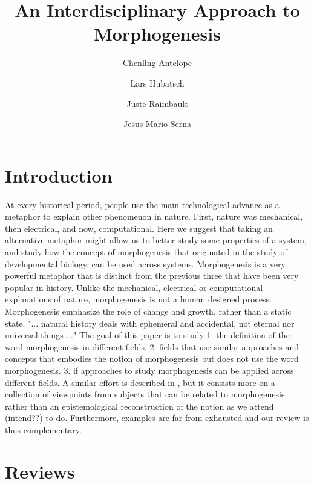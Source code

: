 \documentclass[fleqn,10pt]{wlscirep}
\title{An Interdisciplinary Approach to Morphogenesis}
\author[1]{Chenling Antelope}
\author[2]{Lars Hubatsch}
\author[3]{Juste Raimbault}
\author[4]{Jesus Mario Serna}
\affil[1]{Affiliation, department, city, postcode, country}
\affil[2]{Affiliation, department, city, postcode, country}
\affil[*]{corresponding.author@email.example}
\affil[+]{these authors contributed equally to this work}
\begin{document}
\flushbottom
\maketitle

\thispagestyle{empty}



\section*{Introduction}

At every historical period, people use the main technological advance as a metaphor to explain other phenomenon in nature. First, nature was mechanical, then electrical, and now, computational. Here we suggest that taking an alternative metaphor might allow us to better study some properties of a system, and study how the concept of morphogenesis that originated in the study of developmental biology, can be used across systems. Morphogenesis is a very powerful metaphor that is distinct from the previous three that have been very popular in history. Unlike the mechanical, electrical or computational explanations of nature, morphogenesis is not a human designed process. Morphogenesis emphasize the role of change and growth, rather than a static state. "... natural history deals with ephemeral and accidental, not eternal nor universal things ..." \cite{thompson1942growth} The goal of this paper is to study 1. the definition of the word morphogenesis in different fields. 2. fields that use similar approaches and concepts that embodies the notion of morphogenesis but does not use the word morphogenesis. 3. if approaches to study morphogenesis can be applied across different fields. A similar effort is described in \cite{bourgine2010morphogenesis}, but it consists more on a collection of viewpoints from subjects that can be related to morphogenesis rather than an epistemological reconstruction of the notion as we attend (intend??) to do. Furthermore, examples are far from exhausted and our review is thus complementary.


\section*{Reviews}


%
%
\end{document}
